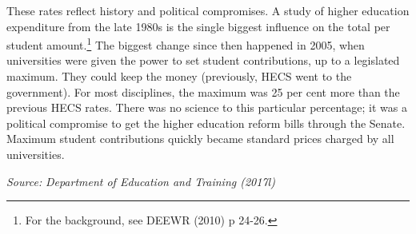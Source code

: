 \documentclass{grattan}
\begin{document}
These rates reflect history and political compromises. A study of higher education expenditure from the late 1980s is the single biggest influence on the total per student amount.\footnote{For the background, see DEEWR (2010) p 24-26.} The biggest change since then happened in 2005, when universities were given the power to set student contributions, up to a legislated maximum. They could keep the money (previously, HECS went to the government). For most disciplines, the maximum was 25 per cent more than the previous HECS rates. There was no science to this particular percentage; it was a political compromise to get the higher education reform bills through the Senate. Maximum student contributions quickly became standard prices charged by all universities.

\begin{table} \caption{Contributions for a 2018 Commonwealth-supported place}


\end{table}

\emph{Source:} \emph{Department of Education and Training (2017l)}
\end{document}
